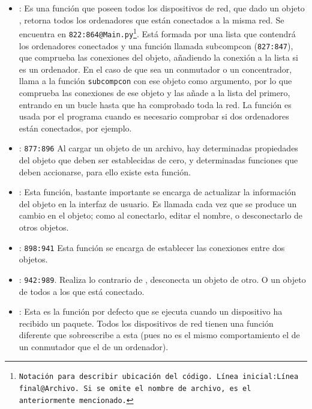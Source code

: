 \documentclass[a4paper, 11pt]{report} %
\begin{document}
\begin{itemize}
\item {}: Es una función que poseen todos los dispositivos de red, que dado un objeto , retorna todos los ordenadores que están conectados a la misma red. Se encuentra en \texttt{822:864@Main.py\footnote{Notación para describir ubicación del código. Línea inicial:Línea final@Archivo. Si se omite el nombre de archivo, es el anteriormente mencionado.}}. Está formada por una lista que contendrá los ordenadores conectados y una función llamada subcompcon (\texttt{827:847}), que comprueba las conexiones del objeto, añadiendo la conexión a la lista si es un ordenador. En el caso de que sea un conmutador o un concentrador, llama a la función \texttt{subcompcon} con ese objeto como argumento, por lo que comprueba las conexiones de ese objeto y las añade a la lista del primero, entrando en un bucle hasta que ha comprobado toda la red. La función es usada por el programa cuando es necesario comprobar si dos ordenadores están conectados, por ejemplo.
\item {}: \texttt{877:896} Al cargar un objeto de un archivo, hay determinadas propiedades del objeto que deben ser establecidas de cero, y determinadas funciones que deben accionarse, para ello existe esta función.
\item {}: Esta función, bastante importante se encarga de actualizar la información del objeto en la interfaz de usuario. Es llamada cada vez que se produce un cambio en el objeto; como al conectarlo, editar el nombre, o desconectarlo de otros objetos.
\item {}: \texttt{898:941} Esta función se encarga de establecer las conexiones entre dos objetos.
\item {}: \texttt{942:989}. Realiza lo contrario de , desconecta un objeto de otro. O un objeto de todos a los que está conectado.
\item {}: Esta es la función por defecto que se ejecuta cuando un dispositivo ha recibido un paquete. Todos los dispositivos de red tienen una función diferente que sobreescribe a esta (pues no es el mismo comportamiento el de un conmutador que el de un ordenador).
\end{itemize}
\end{document}
